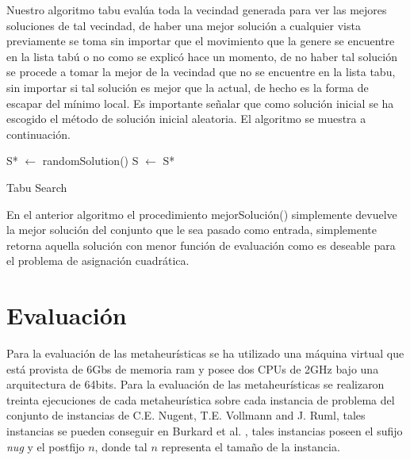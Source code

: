 \documentclass{ci5652}
\begin{document}
Nuestro algoritmo tabu evalúa toda la vecindad generada para ver las mejores soluciones de tal vecindad, de haber una mejor solución a cualquier vista previamente se toma sin importar que el movimiento que la genere se encuentre en la lista tabú o no como se explicó hace un momento, de no haber tal solución se procede a tomar la mejor de la vecindad que no se encuentre en la lista tabu, sin importar si tal solución es mejor que la actual, de hecho es la forma de escapar del mínimo local. Es importante señalar que como solución inicial se ha escogido el método de solución inicial aleatoria. El algoritmo se muestra a continuación.

\begin{algorithm}
 \DontPrintSemicolon
 \vspace*{0.1cm}
 S* $\leftarrow$ randomSolution()\;
 S $\leftarrow$ S*\;
 
 \vspace*{0.1cm}
 \caption{Tabu Search}
\end{algorithm}

En el anterior algoritmo el procedimiento mejorSolución() simplemente devuelve la mejor solución del conjunto que le sea pasado como entrada, simplemente retorna aquella solución con menor función de evaluación como es deseable para el problema de asignación cuadrática.



\section{Evaluación}

Para la evaluación de las metaheurísticas se ha utilizado una máquina virtual que está provista de 6Gbs de memoria ram y posee dos CPUs de 2GHz bajo una arquitectura de 64bits. Para la evaluación de las metaheurísticas se realizaron treinta ejecuciones de cada metaheurística sobre cada instancia de problema del conjunto de instancias de C.E. Nugent, T.E. Vollmann and J. Ruml, tales instancias se pueden conseguir en Burkard et al. \cite{burkard2012}, tales instancias poseen el sufijo \textit{nug} y el postfijo \(n\), donde tal \(n\) representa el tamaño de la instancia.
\end{document}
